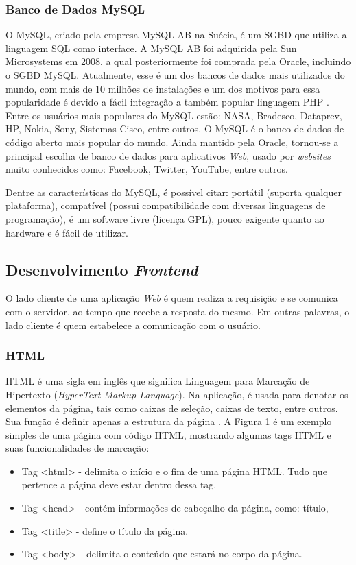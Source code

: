 \subsubsection{Banco de Dados MySQL}
O MySQL, criado pela empresa MySQL AB na Suécia, é um SGBD que utiliza a
linguagem SQL como interface. A MySQL AB foi adquirida pela Sun Microsystems em
2008, a qual posteriormente foi comprada pela Oracle, incluindo o SGBD MySQL.
Atualmente, esse é um dos bancos de dados mais utilizados do mundo, com mais de
10 milhões de instalações e um dos motivos para essa popularidade é devido a fácil
integração a também popular linguagem PHP \cite{mottin}. Entre os usuários mais populares do MySQL estão: NASA, Bradesco, Dataprev, HP, Nokia, Sony, Sistemas Cisco, entre outros.
O MySQL é o banco de dados de código aberto mais popular do mundo. Ainda
mantido pela Oracle, tornou-se a principal escolha de banco de dados para aplicativos
\textit{Web}, usado por \textit{websites} muito conhecidos como: Facebook, Twitter, YouTube, entre
outros.

Dentre as características do MySQL, é possível citar: portátil (suporta qualquer plataforma), compatível (possui compatibilidade com diversas linguagens de programação), é um software livre (licença GPL), pouco exigente quanto ao hardware e é fácil de utilizar.

\subsection{Desenvolvimento \textit{Frontend}}

O lado cliente de uma aplicação \textit{Web} é quem realiza a requisição e se comunica
com o servidor, ao tempo que recebe a resposta do mesmo. Em outras palavras, o
lado cliente é quem estabelece a comunicação com o usuário.

\subsubsection{HTML}

HTML é uma sigla em inglês que significa Linguagem para Marcação de
Hipertexto (\textit{HyperText Markup Language}). Na aplicação, é usada para denotar os 
elementos da página, tais como caixas de seleção, caixas de texto, entre outros. Sua função é
definir apenas a estrutura da página \cite{folle}. A Figura 1 é um exemplo simples de uma página com código HTML, mostrando
algumas tags HTML e suas funcionalidades de marcação:
\begin{itemize}

	\item Tag <html> - delimita o início e o fim de uma página HTML. Tudo que pertence a página deve estar dentro dessa tag.
	\item Tag <head> - contém informações de cabeçalho da página, como: título,
	\item Tag <title> - define o título da página.
	\item Tag <body> - delimita o conteúdo que estará no corpo da página.

\end{itemize}


